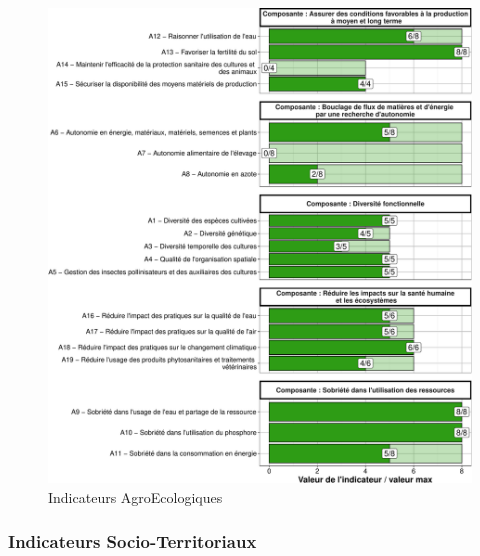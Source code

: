 \documentclass[]{article}
\begin{document}
\begin{figure}[H]
\includegraphics[width=1\linewidth]{report_files/figure-latex/unnamed-chunk-6-1} \caption{Indicateurs AgroEcologiques}\label{fig:unnamed-chunk-6}
\end{figure}

\hypertarget{indicateurs-socio-territoriaux}{%
\subsubsection{Indicateurs
Socio-Territoriaux}\label{indicateurs-socio-territoriaux}}
\end{document}
